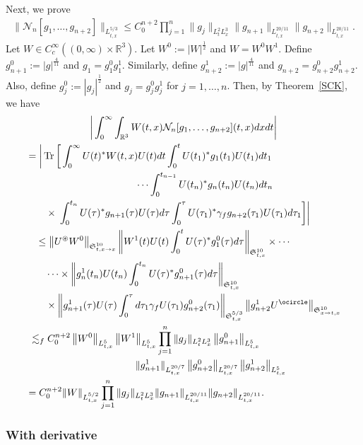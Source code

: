 \documentclass[AHL,Unicode,longabstracts,MathTools,published]{cedram}
\newcommand{\oast}{\circledast}
\newcommand{\BR}{\mathbb{R}}
\newcommand{\CN}{\mathcal{N}}
\newcommand{\FS}{\mathfrak{S}}
\newcommand{\ga}{\gamma}
\newcommand{\ta}{\tau}
\renewcommand{\No}[1]{\left\| #1 \right\|}
\newcommand{\I}{\infty}
\DeclareMathOperator{\Tr}{Tr}
\newcommand{\tx}{{t,x}}
\newcommand{\R}{\mathbb{R}}
\newcommand{\tw}{\frac{1}{2}}
\newcommand{\oc}{\ocircle}
\newcommand{\os}{\oast}
\newcommand{\ls}{\lesssim}
\begin{document}
Next, we prove
\begin{align}\label{eq:no deriv II}
\|\CN_n[g_1,\dots,g_{n+2}]\|_{L^{5/3}_\tx}
\le C_0^{n+2} \prod_{j=1}^n
\|g_j\|_{L^{2}_t L^3_x}
\|g_{n+1}\|_{L^{20/11}_\tx} \|g_{n+2}\|_{L^{20/11}_\tx}.
\end{align}
Let $W \in C_c^\I((0,\I) \times \BR^3)$. Let $W^0 := |W|^\tw$ and $W=W^0 W^1$. Define $g_{n+1}^0 := |g|^{\frac{4}{11}}$ and $g_1 =g_1^0 g_1^1$. Similarly, define $g_{n+2}^1 := |g|^{\frac{4}{11}}$ and $g_{n+2} = g_{n+2}^0 g_{n+2}^1$. Also, define $g_j^0:= |g_j|^\tw$ and $g_j = g_j^0 g_j^1$ for $j=1,\dots,n$. Then, by Theorem~\ref{SCK}, we have
\begin{multline}
\bigg|\int_0^\I \int_{\R^3} W(t,x)\CN_n[g_1,\dots,g_{n+2}](t,x) dx dt \bigg| \\
\begin{aligned}
& = \bigg| \Tr \bigg[\int_0^\I U(t)^* W(t,x) U(t) dt
\int_0^t U(t_1)^* g_1(t_1) U(t_1)dt_1\\
&\mkern200mu
\cdots
\int_0^{t_{n-1}} U(t_n)^* g_n(t_n) U(t_n)dt_n\\
& \qquad \times\left. \left.
\int_0^{t_n} U(\ta)^* g_{n+1}(\ta) U(\ta)d\ta
\int_0^\ta U(\ta_1)^* \ga_f g_{n+2}(\ta_1) U(\ta_1)d\ta_1 \right] \right| \\
&\quad \le \left\|U^\os W^0\right\|_{\FS^{10}_{\tx \to x}}
\No{W^1(t)U(t)\int_0^t U(\ta)^* g_1^0(\ta) d\ta }_{\FS^{10}_\tx}
\times \cdots \\
&\qquad \cdots \times
\No{g_n^1(t_n)U(t_n)\int_0^{t_n} U(\ta)^* g_{n+1}^0(\ta) d\ta }_{\FS^{10}_\tx} \\
&\qquad \times
\No{g_{n+1}^1(\ta)U(\ta) \int_0^\ta d\ta_1 \ga_f U(\ta_1) g_{n+2}^0(\ta_1)}_{\FS^{5/3}_\tx}
\left\|g_{n+2}^1 U^\oc\right\|_{\FS^{10}_{x\to \tx}} \\
&\ \ls_f C_0^{n+2} \left\|W^0\right\|_{L^5_\tx} \left\|W^1\right\|_{L^5_\tx}
\prod_{j=1}^n \|g_j\|_{L^2_t L^3_x}
\left\|g_{n+1}^0\right\|_{L^5_\tx}\\
&\mkern200mu\|g_{n+1}^1\|_{L^{20/7}_\tx}
\left\|g_{n+2}^0\right\|_{L^{20/7}_\tx}
\left\|g_{n+2}^1\right\|_{L^5_\tx}\\
& = C_0^{n+2}
\|W\|_{L^{5/2}_\tx}
\prod_{j=1}^{n} \|g_j\|_{L^2_t L^3_x}
\|g_{n+1}\|_{L^{20/11}_\tx}
\|g_{n+2}\|_{L^{20/11}_\tx}.
\end{aligned}
\end{multline}

\subsubsection{With derivative} 
\end{document}

